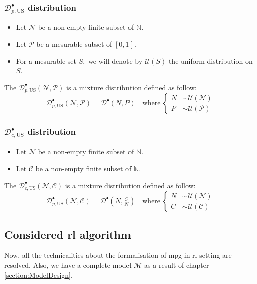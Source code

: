 	\subsubsection{$\mathcal{D}^\bullet_{p,\text{US}}$ distribution}
	\begin{itemize}
		\item Let $\mathcal{N}$ be a non-empty finite subset of $\mathbb{N}.$ 
		\item Let $\mathcal{P}$ be a mesurable subset of $[0,1].$
		\item For a mesurable set $S,$ we will denote by $\mathcal{U}(S)$ the uniform distribution on $S.$
	\end{itemize}
	The $\mathcal{D}^\bullet_{p,\text{US}}(\mathcal{N},\mathcal{P})$ is a mixture distribution defined as follow:
	\begin{equation*}
		\mathcal{D}^\bullet_{p,\text{US}}(\mathcal{N},\mathcal{P}) = \mathcal{D}^\bullet(N,P) \quad \text{where}\ \begin{cases}
			N &\sim \mathcal{U}(\mathcal{N}) \\
			P &\sim \mathcal{U}(\mathcal{P})
		\end{cases}
	\end{equation*}
	
	\subsubsection{$\mathcal{D}^\bullet_{c,\text{US}}$ distribution}
	\begin{itemize}
		\item Let $\mathcal{N}$ be a non-empty finite subset of $\mathbb{N}.$ 
		\item Let $\mathcal{C}$ be a non-empty finite subset of $\mathbb{N}.$
	\end{itemize}
	The $\mathcal{D}^\bullet_{c,\text{US}}(\mathcal{N},\mathcal{C})$ is a mixture distribution defined as follow:
	\begin{equation*}
		\mathcal{D}^\bullet_{p,\text{US}}(\mathcal{N},\mathcal{C}) = \mathcal{D}^\bullet(N,\tfrac{C}{N}) \quad \text{where}\ \begin{cases}
			N &\sim \mathcal{U}(\mathcal{N}) \\
			C &\sim \mathcal{U}(\mathcal{C})
		\end{cases}
	\end{equation*}
\subsection{Considered \acrshort{rl} algorithm}
Now, all the technicalities about the formalisation of \acrshort{mpg} in \acrshort{rl} setting are resolved. Also, we have a complete model $\mathcal{M}$ as a result of chapter \ref{section:ModelDesign}.

